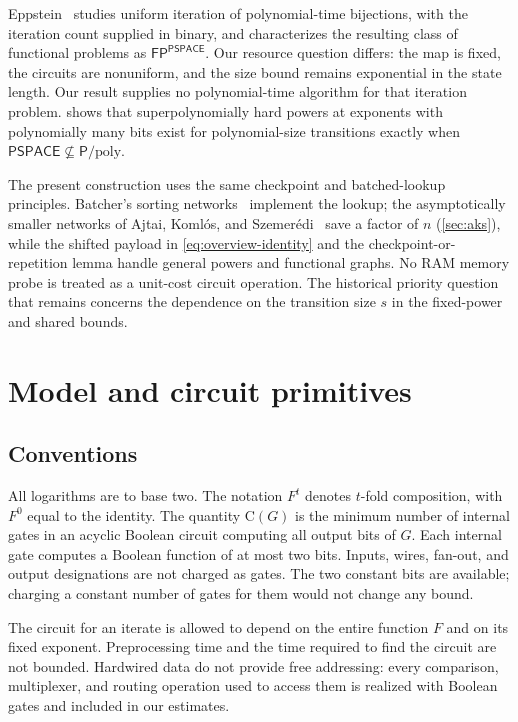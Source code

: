 \documentclass[11pt]{article}
\theoremstyle{definition}
\theoremstyle{remark}
\newcommand{\CC}{\mathrm{C}}
\numberwithin{equation}{section}
\begin{document}
Eppstein~\cite{Eppstein23} studies uniform iteration of polynomial-time
bijections, with the iteration count supplied in binary, and characterizes
the resulting class of functional problems as
$\mathsf{FP}^{\mathsf{PSPACE}}$.  Our resource question differs: the map
is fixed, the circuits are nonuniform, and the size bound remains
exponential in the state length.  Our result supplies no polynomial-time
algorithm for that iteration problem.   shows
that superpolynomially hard powers at exponents with polynomially many
bits exist for polynomial-size transitions exactly when
$\mathsf{PSPACE}\not\subseteq\mathsf{P}/\mathrm{poly}$.

The present construction uses the same checkpoint and batched-lookup
principles.  Batcher's sorting networks~\cite{Batcher68} implement the
lookup; the asymptotically smaller networks of Ajtai, Koml\'os, and
Szemer\'edi~\cite{AKS83} save a factor of $n$ (\cref{sec:aks}), while
the shifted payload in \cref{eq:overview-identity} and the
checkpoint-or-repetition lemma handle general powers and functional graphs.
No RAM memory probe is treated as a unit-cost circuit operation.
The historical priority question that remains concerns the dependence on
the transition size $s$ in the fixed-power and shared bounds.

\section{Model and circuit primitives}\label{sec:model}

\subsection{Conventions}

All logarithms are to base two.  The notation $F^t$ denotes $t$-fold
composition, with $F^0$ equal to the identity.  The quantity $\CC(G)$ is the
minimum number of internal gates in an acyclic Boolean circuit computing
all output bits of $G$.  Each internal gate computes a Boolean function
of at most two bits.  Inputs, wires, fan-out, and output designations are
not charged as gates.  The two constant bits are available; charging a
constant number of gates for them would not change any bound.

The circuit for an iterate is allowed to depend on the entire function
$F$ and on its fixed exponent.  Preprocessing time and the time required
to find the circuit are not bounded.  Hardwired data do not provide free
addressing: every comparison, multiplexer, and routing operation used to
access them is realized with Boolean gates and included in our estimates.
\end{document}
